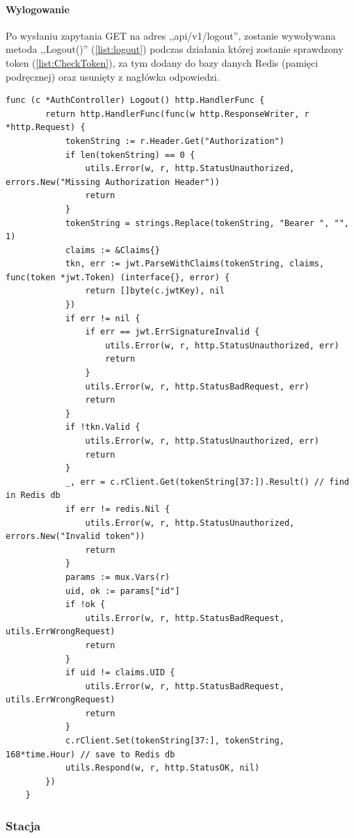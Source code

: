 \paragraph{Wylogowanie}
\newline
Po wysłaniu zapytania GET na adres ,,api/v1/logout'', zostanie wywoływana metoda ,,Logout()'' (\ref{list:logout}) podczas działania której zostanie sprawdzony token (\ref{list:CheckToken}), za tym dodany do bazy danych Redis (pamięci podręcznej) oraz usunięty z nagłówka odpowiedzi.
\begin{lstlisting}[label=list:logout,caption=Wylogowanie,basicstyle=\tiny\ttfamily]
    func (c *AuthController) Logout() http.HandlerFunc {
        return http.HandlerFunc(func(w http.ResponseWriter, r *http.Request) {
            tokenString := r.Header.Get("Authorization")
            if len(tokenString) == 0 {
                utils.Error(w, r, http.StatusUnauthorized, errors.New("Missing Authorization Header"))
                return
            }
            tokenString = strings.Replace(tokenString, "Bearer ", "", 1)
            claims := &Claims{}
            tkn, err := jwt.ParseWithClaims(tokenString, claims, func(token *jwt.Token) (interface{}, error) {
                return []byte(c.jwtKey), nil
            })
            if err != nil {
                if err == jwt.ErrSignatureInvalid {
                    utils.Error(w, r, http.StatusUnauthorized, err)
                    return
                }
                utils.Error(w, r, http.StatusBadRequest, err)
                return
            }
            if !tkn.Valid {
                utils.Error(w, r, http.StatusUnauthorized, err)
                return
            }
            _, err = c.rClient.Get(tokenString[37:]).Result() // find in Redis db
            if err != redis.Nil {
                utils.Error(w, r, http.StatusUnauthorized, errors.New("Invalid token"))
                return
            }
            params := mux.Vars(r)
            uid, ok := params["id"]
            if !ok {
                utils.Error(w, r, http.StatusBadRequest, utils.ErrWrongRequest)
                return
            }
            if uid != claims.UID {
                utils.Error(w, r, http.StatusBadRequest, utils.ErrWrongRequest)
                return
            }
            c.rClient.Set(tokenString[37:], tokenString, 168*time.Hour) // save to Redis db
            utils.Respond(w, r, http.StatusOK, nil)
        })
    }
\end{lstlisting}

\subsubsection{Stacja}
